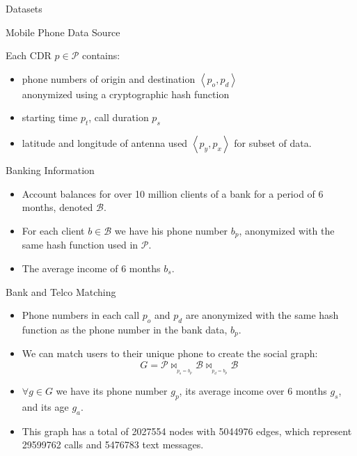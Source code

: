 \documentclass[usenames,dvipsnames]{beamer}
\newcommand{\mathB}{\mathcal{B}}
\newcommand{\mathP}{\mathcal{P}}
\begin{document}
\begin{frame}{Datasets}

\begin{block}{Mobile Phone Data Source}

Each CDR \( p \in \mathP \) contains:
\begin{itemize}
\item phone numbers of origin and destination \( \left< p_o, p_d \right> \) \\
 anonymized using a cryptographic hash function
\item starting time \( p_t \), call duration \( p_s \)
\item latitude and longitude of antenna used \( \left< p_y, p_x \right> \) for subset of data.
\end{itemize} 

\end{block}

\pause

\begin{block}{Banking Information}

\begin{itemize}
\item Account balances for over 10 million clients of a bank for a period of 6 months, denoted \( \mathB \). 
\item For each client \( b \in \mathB \) we have his phone number \( b_p \), anonymized with the same hash function used in \( \mathP \).
\item The average income of 6 months \( b_s \).

\end{itemize}


\end{block}

\end{frame}


\begin{frame}{Bank and Telco Matching}

\begin{itemize}

\item Phone numbers in each call $ p_o $ and $ p_d $ are anonymized with the same hash function as the phone number in the bank data, $ b_p $.

\item We can match users to their unique phone to create the social graph:
$$ G = \mathP \bowtie_{_{p_o = b_p}} \mathB \bowtie_{_{p_d = b_p}} \mathB $$

\item \( \forall g \in G \) we have its phone number \( g_p \),  its average income over 6 months \( g_s \), and its age \( g_a \).

\item This graph has a total of \num{2027554} nodes with \num{5044976} edges, which represent \num{29599762} calls and \num{5476783} text messages.
\end{itemize}

\end{frame}
\end{document}
